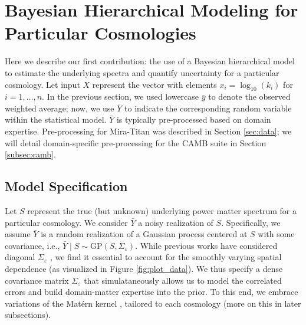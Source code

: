\documentclass[11pt]{article}
\begin{document}

\section{Bayesian Hierarchical Modeling for Particular Cosmologies}
\label{sec:hm_fit}

Here we describe our first contribution: the use of a Bayesian hierarchical model 
to estimate the underlying spectra and quantify uncertainty for a particular cosmology.
Let input $X$ represent the vector with elements $x_i = \log_{10}(k_i)$ for $i=1,\dots,n$.
In the previous section, we used lowercase $\bar{y}$ to denote 
the observed weighted average; now, we use $\bar{Y}$ to indicate the corresponding 
random variable within the statistical model.  
$\bar{Y}$ is typically pre-processed
based on domain expertise.  Pre-processing for Mira-Titan was described in Section 
\ref{sec:data}; we will detail domain-specific pre-processing 
for the CAMB suite in Section \ref{subsec:camb}.

\subsection{Model Specification}

Let $S$ represent the true (but unknown) underlying power matter spectrum for
a particular cosmology.  We consider $\bar{Y}$ a noisy realization of $S$.
Specifically, we assume $\bar{Y}$ is a random realization of a Gaussian 
process centered at $S$ with some covariance, i.e., 
$\bar{Y}\mid S \sim \mathrm{GP}(S, \Sigma_\varepsilon)$.  While previous works
have considered diagonal $\Sigma_\varepsilon$ \citep{moran2024dpc}, we find it
essential to account for the smoothly varying spatial dependence
(as visualized in Figure \ref{fig:plot_data}).  We thus specify a dense 
covariance matrix $\Sigma_\varepsilon$ that simulataneously
allows us to model the correlated errors and build domain-matter expertise
into the prior. To this end, we embrace variations of the Mat\'ern kernel 
\citep{stein1999interpolation}, tailored to each cosmology (more on this in later 
subsections). 
\end{document}
